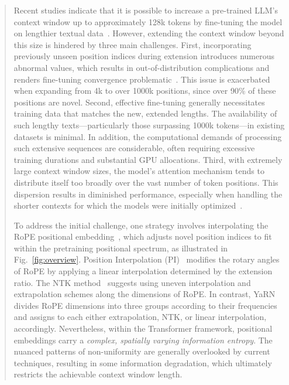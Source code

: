 \begin{abstract}
Recent studies indicate that it is possible to increase a pre-trained LLM's context window up to approximately 128k tokens by fine-tuning the model on lengthier textual data~\cite{longlora,pi,yarn,zhang2024soaring,liu2023scaling}. However, extending the context window beyond this size is hindered by three main challenges. First, incorporating previously unseen position indices during extension introduces numerous abnormal values, which results in out-of-distribution complications and renders fine-tuning convergence problematic~\cite{pi}. This issue is exacerbated when expanding from 4k to over 1000k positions, since over 90\% of these positions are novel. Second, effective fine-tuning generally necessitates training data that matches the new, extended lengths. The availability of such lengthy texts—particularly those surpassing 1000k tokens—in existing datasets is minimal. In addition, the computational demands of processing such extensive sequences are considerable, often requiring excessive training durations and substantial GPU allocations. Third, with extremely large context window sizes, the model’s attention mechanism tends to distribute itself too broadly over the vast number of token positions. This dispersion results in diminished performance, especially when handling the shorter contexts for which the models were initially optimized~\cite{pi}.

To address the initial challenge, one strategy involves interpolating the RoPE positional embedding~\cite{rope,pi}, which adjusts novel position indices to fit within the pretraining positional spectrum, as illustrated in Fig.~\ref{fig:overview}. Position Interpolation (PI)~\cite{pi} modifies the rotary angles of RoPE by applying a linear interpolation determined by the extension ratio. The NTK method~\cite{ntk,dynamicntk} suggests using uneven interpolation and extrapolation schemes along the dimensions of RoPE. In contrast, YaRN~\cite{yarn} divides RoPE dimensions into three groups according to their frequencies and assigns to each either extrapolation, NTK, or linear interpolation, accordingly. Nevertheless, within the Transformer framework, positional embeddings carry a \emph{complex, spatially varying information entropy}. The nuanced patterns of non-uniformity are generally overlooked by current techniques, resulting in some information degradation, which ultimately restricts the achievable context window length.


\end{abstract}
